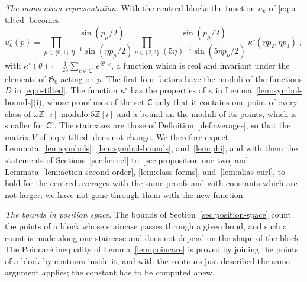 \documentclass[11pt]{preprint}
\numberwithin{equation}{section}
\theoremstyle{definition}
\theoremstyle{remark}
\theoremstyle{plain}
\begin{document}
\emph{The momentum representation.} With the centred blocks the function $u_k$ of \eqref{eq:u-tilted} becomes
\begin{equation}\label{eq:u-centred}
    u^\circ_k(p) = \prod_{\mu \in \{ 0, 1 \}}\frac{\sin(p_\mu/2)}{\eta^{-1}\sin(\eta p_\mu/2)}\prod_{\mu \in \{ 2, 3 \}}\frac{\sin(p_\mu/2)}{(5\eta)^{-1}\sin(5\eta p_\mu/2)}\,\kappa^\circ(\eta p_2, \eta p_3)\;,
\end{equation}
with $\kappa^\circ(\theta) \coloneqq \frac{1}{25}\sum_{c \in \mathsf C^\circ}e^{i\theta \cdot c}$, a function which is real and invariant under the elements of $\mathfrak G_0$ acting on $p$. The first four factors have the moduli of the functions $D$ in \eqref{eq:u-tilted}. The function $\kappa^\circ$ has the properties of $\kappa$ in Lemma~\ref{lem:symbol-bounds}(i), whose proof uses of the set $\mathsf C$ only that it contains one point of every class of $\omega\mathbb Z[i]$ modulo $5\mathbb Z[i]$ and a bound on the moduli of its points, which is smaller for $\mathsf C^\circ$. The staircases are those of Definition~\ref{def:averages}, so that the matrix $V$ of \eqref{eq:v-tilted} does not change. We therefore expect Lemmata~\ref{lem:symbols}, \ref{lem:symbol-bounds}, and~\ref{lem:phi}, and with them the statements of Sections~\ref{sec:kernel} to~\ref{sec:proposition-one-two} and Lemmata~\ref{lem:action-second-order}, \ref{lem:class-forms}, and~\ref{lem:alias-curl}, to hold for the centred averages with the same proofs and with constants which are not larger; we have not gone through them with the new function.

\emph{The bounds in position space.} The bounds of Section~\ref{sec:position-space} count the points of a block whose staircase passes through a given bond, and such a count is made along one staircase and does not depend on the shape of the block. The Poincar\'e inequality of Lemma~\ref{lem:poincare} is proved by joining the points of a block by contours inside it, and with the contours just described the same argument applies; the constant has to be computed anew.
\end{document}
